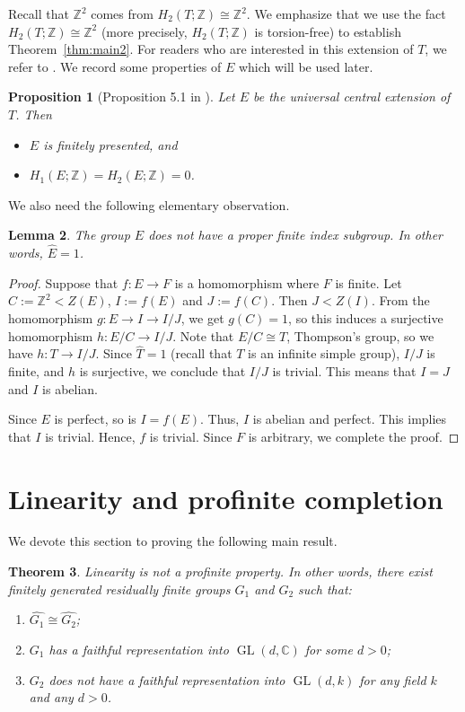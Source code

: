 \documentclass[11pt]{amsart}
\newtheorem{thm}{Theorem}[section]
\newtheorem{lem}[thm]{Lemma}
\newtheorem{prop}[thm]{Proposition}
\theoremstyle{definition}
\DeclareMathOperator{\GL}{GL}
\newcommand{\ZZ}{\mathbb{Z}}
\newcommand{\CC}{\mathbb{C}}
\begin{document}
 Recall that $\ZZ^2$ comes from $H_2(T;\ZZ) \cong \ZZ^2$.
 We emphasize that we use the fact $H_2(T;\ZZ) \cong \ZZ^2$ (more precisely, $H_2(T;\ZZ)$ is torsion-free) to establish Theorem~\ref{thm:main2}.
 For readers who are interested in this extension of $T$, we refer to \cite[Section 5]{heuer2021spectrum}.
We record some properties of $E$ which will be used later.

\begin{prop}[Proposition 5.1 in \cite{heuer2021spectrum}] \label{prop:E-property}
 Let $E$ be the universal central extension of $T$. Then
 \begin{itemize}
    \item $E$ is finitely presented, and
    \item $H_1(E;\ZZ)=H_2(E;\ZZ)=0$.
 \end{itemize}
\end{prop}

 We also need the following elementary observation.

\begin{lem}
The group $E$ does not have a proper finite index subgroup. In other words, $\widehat{E}=1$.
\end{lem}
\begin{proof}
 Suppose that $f:E \to F$ is a homomorphism where $F$ is finite.
 Let $C:= \ZZ^2 < Z(E)$, $I:=f(E)$ and $J:=f(C)$.
 Then $J < Z(I)$. From the homomorphism $g:E \to I \to I/J$, we get $g(C)=1$, so this induces a surjective homomorphism $h:E/C \to I/J$.
 Note that $E/C \cong T$, Thompson's group, so we have $h:T \to I/J$. 
 Since $\widehat{T}=1$ (recall that $T$ is an infinite simple group), $I/J$ is finite, and $h$ is surjective, we conclude that $I/J$ is trivial.
 This means that $I=J$ and $I$ is abelian.

 Since $E$ is perfect, so is $I=f(E)$.
 Thus, $I$ is abelian and perfect. This implies that $I$ is trivial.
 Hence, $f$ is trivial.
 Since $F$ is arbitrary, we complete the proof.
\end{proof}

\section{Linearity and profinite completion} \label{sec:main1}
 We devote this section to proving the following main result.

\begin{thm} \label{thm:main1}
Linearity is not a profinite property.
In other words, there exist finitely generated residually finite groups $G_1$ and $G_2$ such that:
\begin{enumerate}[label=(\arabic*)]
  \item $\widehat{G_1} \cong \widehat{G_2}$;
  \item $G_1$ has a faithful representation into $\GL(d,\CC)$ for some $d>0$;
  \item $G_2$ does not have a faithful representation into $\GL(d,k)$ for any field $k$ and any $d>0$.
\end{enumerate}
\end{thm}
\end{document}
